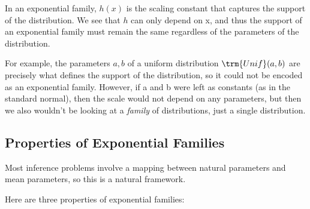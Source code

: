 \documentclass{article}
\begin{document}
In an exponential family, $h(x)$ is the scaling constant that captures the support of the distribution. We see that $h$ can only depend on x, and thus the support of an exponential family must remain the same regardless of the parameters of the distribution.

For example, the parameters $a,b$ of a uniform distribution $\trm{Unif}(a,b)$ are precisely what defines the support of the distribution, so it could not be encoded as an exponential family. However, if a and b were left as constants (as in the standard normal), then the scale would not depend on any parameters, but then we also wouldn't be looking at a \textit{family} of distributions, just a single distribution.

\subsection{Properties of Exponential Families}
Most inference problems involve a mapping between natural parameters and mean parameters, so this is a natural framework. 


Here are three properties of exponential families:
\end{document}
